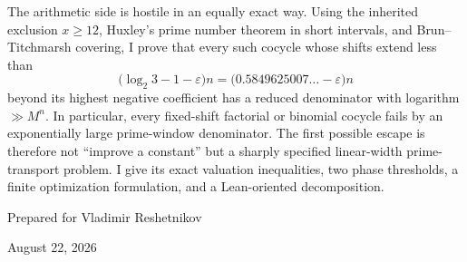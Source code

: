 \documentclass[11pt,oneside]{article}
\theoremstyle{definition}
\theoremstyle{remark}
\begin{document}
\begin{titlepage}
\begin{minipage}{0.91\textwidth}
The arithmetic side is hostile in an equally exact way.  Using the inherited exclusion
$x\ge12$, Huxley's prime number theorem in short intervals, and Brun--Titchmarsh covering,
I prove that every such cocycle whose shifts extend less than
\[
 \bigl(\log_2 3-1-\varepsilon\bigr)n
 =\bigl(0.5849625007\ldots-\varepsilon\bigr)n
\]
beyond its highest negative coefficient has a reduced denominator with logarithm
$\gg M^n$.  In particular, every fixed-shift factorial or binomial cocycle fails by an
exponentially large prime-window denominator.  The first possible escape is therefore not
``improve a constant'' but a sharply specified linear-width prime-transport problem.  I give
its exact valuation inequalities, two phase thresholds, a finite optimization formulation,
and a Lean-oriented decomposition.
\end{minipage}
\vfill
{\large Prepared for Vladimir Reshetnikov\par}
\vspace{0.12cm}
{\large August 22, 2026\par}
\end{titlepage}
\hypersetup{pageanchor=true}

\end{document}
